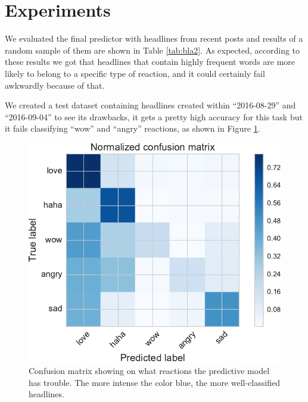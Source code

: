 \documentclass[10pt]{article}
\begin{document}
\section{Experiments}

We evaluated the final predictor with headlines from recent posts and results of a random sample of them are shown in Table \ref{tab:bla2}. As expected, according to these results we got that headlines that contain highly frequent words are more likely to belong to a specific type of reaction, and it could certainly fail awkwardly because of that.

We created a test dataset containing headlines created within ``2016-08-29'' and ``2016-09-04'' to see its drawbacks, it gets a pretty high accuracy for this task but it fails classifying ``wow'' and ``angry'' reactions, as shown in Figure \ref{fig:conf}.

\begin{figure}[ht!]
\centering
\includegraphics[width=0.9\columnwidth]{../3_notebooks/notebook_figures/conf.pdf}
\caption{Confusion matrix showing on what reactions the predictive model has trouble. The more intense the color blue, the more well-classified headlines.}
\label{fig:conf}
\end{figure}
\end{document}
